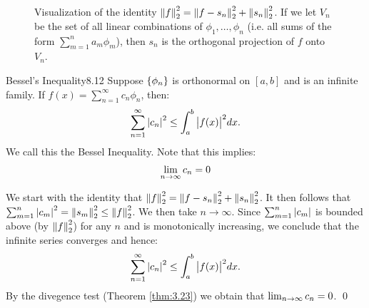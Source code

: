 \begin{figure}[htbp]
    \centering
    
    \caption{Visualization of the identity $\norm{f}_2^2 = \norm{f - s_n}_2^2 + \norm{s_n}_2^2$. If we let $V_n$ be the set of all linear combinations of $\phi_1, \ldots, \phi_n$ (i.e. all sums of the form $\sum_{m=1}^n a_m\phi_m$), then $s_n$ is the orthogonal projection of $f$ onto $V_n$.}
    \label{fig55}
\end{figure}

\begin{theorem}{Bessel's Inequality}{8.12}
    Suppose $\set{\phi_n}$ is orthonormal on $[a, b]$ and is an infinite family. If $f(x) = \sum_{n=1}^\infty c_n \phi_n$, then:
    \begin{align*}
        \sum_{n=1}^\infty \abs{c_n}^2 \leq \int_a^b \abs{f(x)}^2 dx.
    \end{align*}
    We call this the Bessel Inequality. Note that this implies:
    \begin{align*}
        \lim_{n \rightarrow \infty} c_n = 0
    \end{align*}
\end{theorem}

\begin{nproof}
    We start with the identity that $\norm{f}_2^2 = \norm{f - s_n}_2^2 + \norm{s_n}_2^2$. It then follows that $\sum_{m=1}^n \abs{c_m}^2 = \norm{s_m}_2^2 \leq \norm{f}_2^2$. We then take $n \rightarrow \infty$. Since $\sum_{m=1}^n \abs{c_m}$ is bounded above (by $\norm{f}_2^2$) for any $n$ and is monotonically increasing, we conclude that the infinite series converges and hence:
    \begin{align*}
        \sum_{n=1}^\infty \abs{c_n}^2 \leq \int_a^b \abs{f(x)}^2 dx.
    \end{align*}
    By the divegence test (Theorem \ref{thm:3.23}) we obtain that $\lim_{n \rightarrow \infty} c_n = 0$. \qed
\end{nproof}

